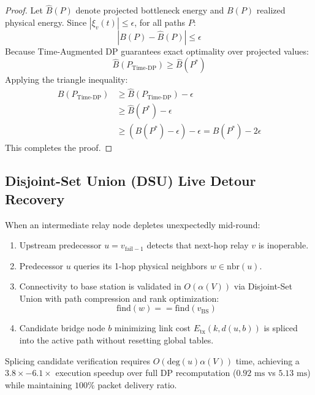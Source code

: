\documentclass[journal]{IEEEtran}
\begin{document}
\begin{proof}
Let $\hat{B}(P)$ denote projected bottleneck energy and $B(P)$ realized physical energy. Since $|\xi_v(t)| \le \epsilon$, for all paths $P$:
\begin{equation}
|B(P) - \hat{B}(P)| \le \epsilon
\end{equation}
Because Time-Augmented DP guarantees exact optimality over projected values:
\begin{equation}
\hat{B}(P_{\text{Time-DP}}) \ge \hat{B}(P^*)
\end{equation}
Applying the triangle inequality:
\begin{align}
B(P_{\text{Time-DP}}) &\ge \hat{B}(P_{\text{Time-DP}}) - \epsilon \\
&\ge \hat{B}(P^*) - \epsilon \\
&\ge (B(P^*) - \epsilon) - \epsilon = B(P^*) - 2\epsilon
\end{align}
This completes the proof.
\end{proof}

\subsection{Disjoint-Set Union (DSU) Live Detour Recovery}
When an intermediate relay node depletes unexpectedly mid-round:
\begin{enumerate}
    \item Upstream predecessor $u = v_{\text{fail}-1}$ detects that next-hop relay $v$ is inoperable.
    \item Predecessor $u$ queries its 1-hop physical neighbors $w \in \text{nbr}(u)$.
    \item Connectivity to base station is validated in $O(\alpha(V))$ via Disjoint-Set Union with path compression and rank optimization:
    \begin{equation}
    \text{find}(w) == \text{find}(v_{\text{BS}})
    \end{equation}
    \item Candidate bridge node $b$ minimizing link cost $E_{\text{tx}}(k, d(u, b))$ is spliced into the active path without resetting global tables.
\end{enumerate}

Splicing candidate verification requires $O(\text{deg}(u)\alpha(V))$ time, achieving a $3.8\times - 6.1\times$ execution speedup over full DP recomputation ($0.92\text{ ms}$ vs $5.13\text{ ms}$) while maintaining $100\%$ packet delivery ratio.
\end{document}
